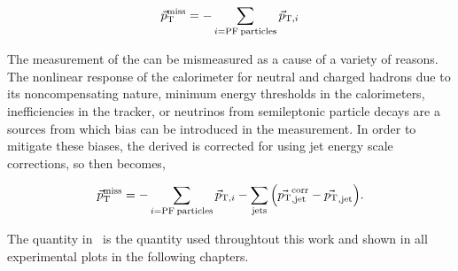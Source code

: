 \begin{equation}
  { \vec{p}_{\text{T}}^{\text{miss}}} = -\sum_{i=\mathrm{PF\:particles}}{\vec{p}_{\text{T},i}}
  \label{eq:met}
\end{equation}

The measurement of the \ptmiss can be mismeasured as a cause of a variety of reasons. The nonlinear response of the calorimeter for neutral and charged hadrons due to its noncompensating nature, minimum energy thresholds in the calorimeters, inefficiencies in the tracker, or neutrinos from semileptonic particle decays are a sources from which bias can be introduced in the \ptmiss measurement. In order to mitigate these biases, the \ptmiss derived is corrected for using jet energy scale corrections, so  then becomes,

\begin{equation}
  { \vec{p}_{\text{T}}^{\text{miss}}} = -\sum_{i=\mathrm{PF\:particles}}{\vec{p}_{\text{T},i}} - \sum_{\mathrm{jets}}{\Big(\vec{p_{\mathrm{T}}}^{\mathrm{corr}}_{\mathrm{,jet}} - \vec{p_{\mathrm{T}}}_{\mathrm{,jet}}\Big)}.
  \label{eq:Type1met}
\end{equation} 

The quantity in~ is the \MET quantity used throughtout this work and shown in all experimental plots in the following chapters.

